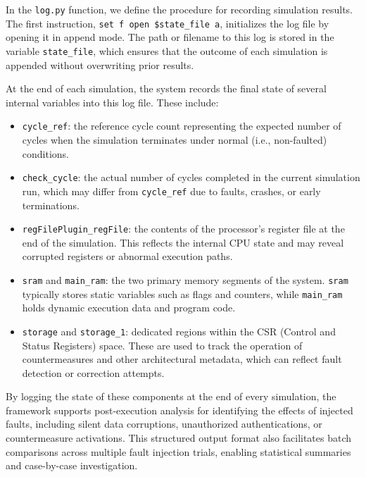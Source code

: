 In the \texttt{log.py} function, we define the procedure for recording simulation results. The first instruction, \texttt{set f open \$state\_file a}, initializes the log file by opening it in append mode. The path or filename to this log is stored in the variable \texttt{state\_file}, which ensures that the outcome of each simulation is appended without overwriting prior results.

At the end of each simulation, the system records the final state of several internal variables into this log file. These include:

\begin{itemize}
\item \texttt{cycle\_ref}: the reference cycle count representing the expected number of cycles when the simulation terminates under normal (i.e., non-faulted) conditions.

\item \texttt{check\_cycle}: the actual number of cycles completed in the current simulation run, which may differ from \texttt{cycle\_ref} due to faults, crashes, or early terminations.

\item \texttt{regFilePlugin\_regFile}: the contents of the processor’s register file at the end of the simulation. This reflects the internal CPU state and may reveal corrupted registers or abnormal execution paths.

\item \texttt{sram} and \texttt{main\_ram}: the two primary memory segments of the system. \texttt{sram} typically stores static variables such as flags and counters, while \texttt{main\_ram} holds dynamic execution data and program code.

\item \texttt{storage} and \texttt{storage\_1}: dedicated regions within the CSR (Control and Status Registers) space. These are used to track the operation of countermeasures and other architectural metadata, which can reflect fault detection or correction attempts.

\end{itemize}

By logging the state of these components at the end of every simulation, the framework supports post-execution analysis for identifying the effects of injected faults, including silent data corruptions, unauthorized authentications, or countermeasure activations. This structured output format also facilitates batch comparisons across multiple fault injection trials, enabling statistical summaries and case-by-case investigation.

